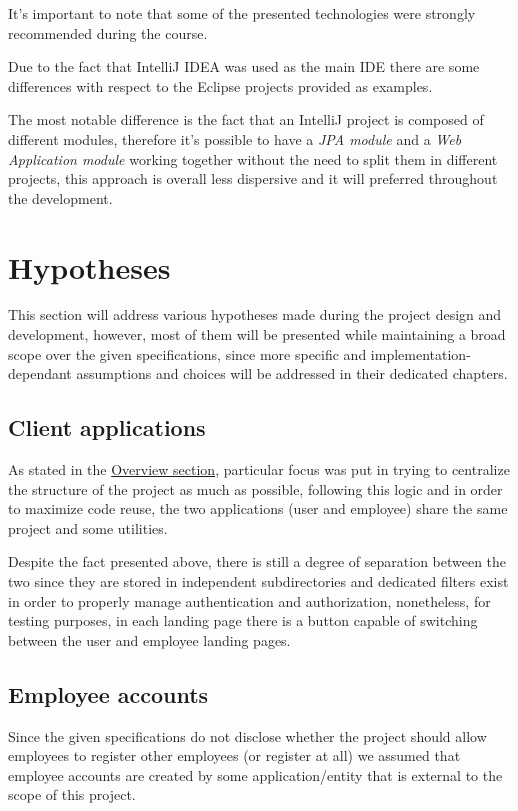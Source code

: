 It's important to note that some of the presented technologies were strongly recommended during the course. 

Due to the fact that IntelliJ IDEA was used as the main IDE there are some differences with respect to the Eclipse projects provided as examples. 

The most notable difference is the fact that an IntelliJ project is composed of different modules, therefore it's possible to have a \textit{JPA module} and a \textit{Web Application module} working together without the need to split them in different projects, this approach is overall less dispersive and it will preferred throughout the development.


\section{Hypotheses}
\label{sec:hypotheses}

This section will address various hypotheses made during the project design and development, however, most of them will be presented while maintaining a broad scope over the given specifications, since more specific and implementation-dependant assumptions and choices will be addressed in their dedicated chapters. 

\subsection*{Client applications}

As stated in the \hyperref[sec:overview]{Overview section}, particular focus was put in trying to centralize the structure of the project as much as possible, following this logic and in order to maximize code reuse, the two applications (user and employee) share the same project and some utilities.

Despite the fact presented above, there is still a degree of separation between the two since they are stored in independent subdirectories and dedicated filters exist in order to properly manage authentication and authorization, nonetheless, for testing purposes, in each landing page there is a button capable of switching between the user and employee landing pages.

\subsection*{Employee accounts}

Since the given specifications do not disclose whether the project should allow employees to register other employees (or register at all) we assumed that employee accounts are created by some application/entity that is external to the scope of this project.


